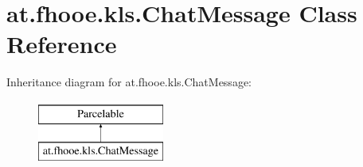 \hypertarget{classat_1_1fhooe_1_1kls_1_1_chat_message}{\section{at.\-fhooe.\-kls.\-Chat\-Message Class Reference}
\label{classat_1_1fhooe_1_1kls_1_1_chat_message}
}
Inheritance diagram for at.\-fhooe.\-kls.\-Chat\-Message\-:\begin{figure}[H]
\begin{center}
\leavevmode
\includegraphics[height=2.000000cm]{classat_1_1fhooe_1_1kls_1_1_chat_message}
\end{center}
\end{figure}
